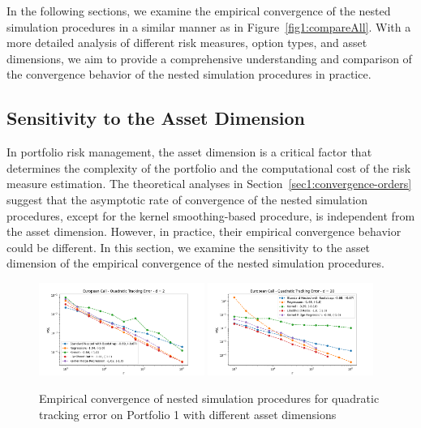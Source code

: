 In the following sections, we examine the empirical convergence of the nested simulation procedures in a similar manner as in Figure~\ref{fig1:compareAll}.
With a more detailed analysis of different risk measures, option types, and asset dimensions, we aim to provide a comprehensive understanding and comparison of the convergence behavior of the nested simulation procedures in practice.

\subsection{Sensitivity to the Asset Dimension} \label{sec1:sensitivity-dimension}
In portfolio risk management, the asset dimension is a critical factor that determines the complexity of the portfolio and the computational cost of the risk measure estimation.
The theoretical analyses in Section~\ref{sec1:convergence-orders} suggest that the asymptotic rate of convergence of the nested simulation procedures, except for the kernel smoothing-based procedure, is independent from the asset dimension.
However, in practice, their empirical convergence behavior could be different.
In this section, we examine the sensitivity to the asset dimension of the empirical convergence of the nested simulation procedures.

\begin{figure}[ht!]
    \centering
    \includegraphics[width=0.48\textwidth]{./project1/figures/figure2a.png}
    \includegraphics[width=0.48\textwidth]{./project1/figures/figure2b.png}
    \caption{Empirical convergence of nested simulation procedures for quadratic tracking error on Portfolio 1 with different asset dimensions}
    \label{fig1:assetDimension} 
\end{figure}


